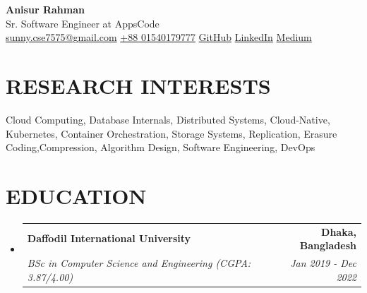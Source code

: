 \documentclass[letterpaper,11pt]{article}
\makeatletter
\newcommand{\resumeSubheading}[4]{
  \vspace{-2pt}\item
    \begin{tabular*}{1.0\textwidth}[t]{l@{\extracolsep{\fill}}r}
      \textbf{\large#1} & \textbf{\small #2} \\
      \textit{\large#3} & \textit{\small #4} \\
    \end{tabular*}\vspace{-7pt}
}
\newcommand{\resumeSubHeadingListStart}{\begin{itemize}[leftmargin=0.0in, label={}]}
\newcommand{\resumeSubHeadingListEnd}{\end{itemize}}
\makeatother
\begin{document}
\begin{flushleft}
    {\Huge \textbf{Anisur Rahman}} \\[4pt]
    {\large Sr. Software Engineer at AppsCode} \\[6pt]

    \faEnvelope \;
    \href{mailto:sunny.cse7575@gmail.com}{sunny.cse7575@gmail.com}
    \quad
    \faPhone \;
    \href{tel:+8801540179777}{+88 01540179777}
    \quad
    \faGithub \;
    \href{https://github.com/anisurrahman75}{GitHub}
    \quad
    \faLinkedin \;
    \href{https://linkedin.com/in/anisur-rahman75/}{LinkedIn}
    \quad
    \faMedium \;
    \href{https://medium.com}{Medium}
\end{flushleft}


\section{\color{airforceblue}RESEARCH INTERESTS}
\begin{itemize}[leftmargin=0in, label={}]
\small{\item{
Cloud Computing, Database Internals, Distributed Systems, Cloud-Native, 
Kubernetes, Container Orchestration, Storage Systems, Replication,
Erasure Coding,Compression, Algorithm Design, Software Engineering, DevOps
}}
\end{itemize}
 \vspace{-10pt}

\section{\color{airforceblue}EDUCATION}
  \resumeSubHeadingListStart
    \resumeSubheading
      {Daffodil International University}{Dhaka, Bangladesh}
      {BSc in Computer Science and Engineering (CGPA: 3.87/4.00)}{Jan 2019 - Dec 2022}
  \resumeSubHeadingListEnd
  \vspace{-10pt}


\end{document}
